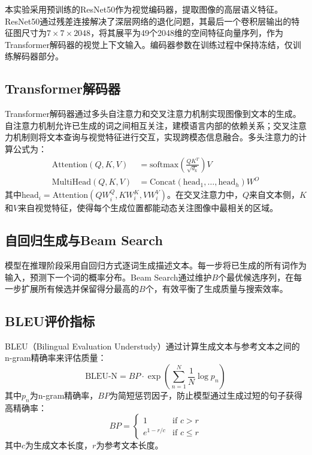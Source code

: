 \documentclass[12pt,a4paper]{article}
\begin{document}
本实验采用预训练的ResNet50作为视觉编码器，提取图像的高层语义特征。ResNet50通过残差连接解决了深层网络的退化问题，其最后一个卷积层输出的特征图尺寸为$7\times7\times2048$，将其展平为49个2048维的空间特征向量序列，作为Transformer解码器的视觉上下文输入。编码器参数在训练过程中保持冻结，仅训练解码器部分。

\subsection{Transformer解码器}

Transformer解码器通过多头自注意力和交叉注意力机制实现图像到文本的生成。自注意力机制允许已生成的词之间相互关注，建模语言内部的依赖关系；交叉注意力机制则将文本查询与视觉特征进行交互，实现跨模态信息融合。多头注意力的计算公式为：
\begin{align}
\text{Attention}(Q, K, V) &= \text{softmax}\left(\frac{QK^T}{\sqrt{d_k}}\right)V \\
\text{MultiHead}(Q, K, V) &= \text{Concat}(\text{head}_1, \ldots, \text{head}_h)W^O
\end{align}
其中$\text{head}_i = \text{Attention}(QW_i^Q, KW_i^K, VW_i^V)$。在交叉注意力中，$Q$来自文本侧，$K$和$V$来自视觉特征，使得每个生成位置都能动态关注图像中最相关的区域。

\subsection{自回归生成与Beam Search}

模型在推理阶段采用自回归方式逐词生成描述文本。每一步将已生成的所有词作为输入，预测下一个词的概率分布。Beam Search通过维护$B$个最优候选序列，在每一步扩展所有候选并保留得分最高的$B$个，有效平衡了生成质量与搜索效率。

\subsection{BLEU评价指标}

BLEU（Bilingual Evaluation Understudy）通过计算生成文本与参考文本之间的n-gram精确率来评估质量：
\begin{equation}
\text{BLEU-N} = BP \cdot \exp\left(\sum_{n=1}^{N}\frac{1}{N}\log p_n\right)
\end{equation}
其中$p_n$为n-gram精确率，$BP$为简短惩罚因子，防止模型通过生成过短的句子获得高精确率：
\begin{equation}
BP = \begin{cases} 1 & \text{if } c > r \\ e^{1-r/c} & \text{if } c \leq r \end{cases}
\end{equation}
其中$c$为生成文本长度，$r$为参考文本长度。
\end{document}
